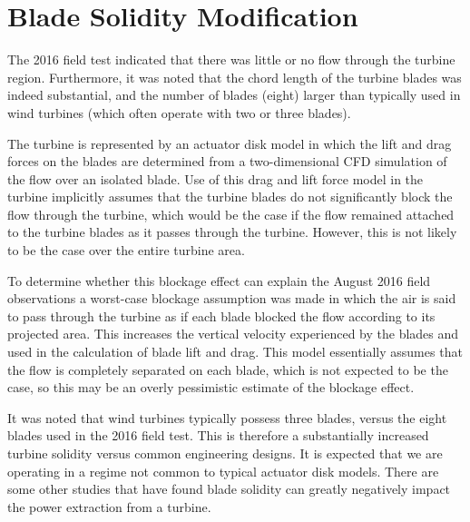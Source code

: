 \section{Blade Solidity Modification}
\label{sec:solidity}
%
%

The 2016 field test indicated that there was little or no flow through
the turbine region. Furthermore, it was noted that the chord length of
the turbine blades was indeed substantial, and the number of blades
(eight) larger than typically used in wind turbines (which often operate
with two or three blades).

The turbine is represented by an actuator disk model in which the lift
and drag forces on the blades are determined from a two-dimensional CFD 
simulation of the flow over an isolated blade. Use of this drag 
and lift force model in the turbine implicitly assumes that the 
turbine blades do not significantly block the flow through the 
turbine, which would be the case if the flow remained attached 
to the turbine blades as it passes through the turbine. However, 
this is not likely to be the case over the entire turbine area. 

To determine whether this blockage effect can explain the August 2016
field observations a worst-case blockage assumption was made in which
the air is said to pass through the turbine as if each blade blocked the
flow according to its projected area. This increases the vertical
velocity experienced by the blades and used in the calculation of blade
lift and drag. This model essentially assumes that the flow is
completely separated on each blade, which is not expected to be the
case, so this may be an overly pessimistic estimate of the blockage effect. 

It was noted that wind turbines typically possess three blades, versus
 the eight blades used in the 2016 field test. This is therefore a 
 substantially increased turbine solidity versus common engineering
 designs. It is expected that we are operating in a regime not common to
 typical actuator disk models. There are some other studies that have
 found blade solidity can greatly negatively impact the power extraction
 from a turbine\cite{solidity_oxford}. 




